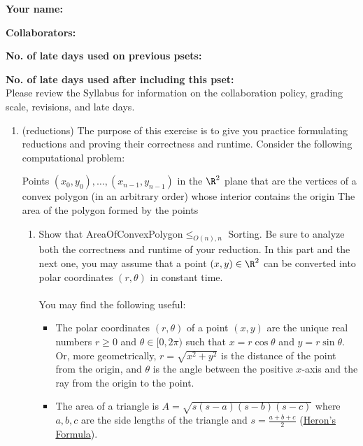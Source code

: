 \documentclass[11pt]{article}
\begin{document}

\textbf{Your name: }

\textbf{Collaborators: }

\textbf{No. of late days used on previous psets: }

\textbf{No. of late days used after including this pset: }
\\

Please review the Syllabus for information on the collaboration 
policy, grading scale, revisions, and late days.


\begin{enumerate}
     \item  (reductions) The purpose of this exercise is to give you practice formulating reductions and proving their correctness and runtime.
    Consider the following computational problem:

    {Points $(x_0,y_0),\ldots,(x_{n-1},y_{n-1})$ in the $\R^2$ plane that are the vertices of a convex polygon (in an arbitrary order) whose interior contains the origin}
    {The area of the polygon formed by the points}


    \begin{enumerate}
        \item \label{part:polar} 
        Show that AreaOfConvexPolygon$\leq_{O(n),n}$ Sorting.  Be sure to analyze both the correctness and runtime of your reduction.
        In this part and the next one, you may assume that a point $(x,y)\in \R^2$ can be converted into polar coordinates $(r,\theta)$ in constant time. 
        \\\\
        You may find the following useful:
        \begin{itemize}
            \item The polar coordinates $(r,\theta)$ of a point $(x,y)$ are the unique real numbers $r\geq 0$ and $\theta\in [0,2\pi)$ such that $x=r\cos \theta$ and $y=r\sin \theta$. Or, more geometrically, $r=\sqrt{x^2+y^2}$ is the distance of the point from the origin, and $\theta$ is the angle between the positive $x$-axis and the ray from the origin to the point.
            \item The area of a triangle is $A = \sqrt{s(s-a)(s-b)(s-c)}$ where $a, b, c$ are the side lengths of the triangle and $s = \frac{a + b + c}{2}$ (\href{https://en.wikipedia.org/wiki/Heron\%27s_formula}{Heron's Formula}).
        \end{itemize}
        

\end{enumerate}
\end{enumerate}
\end{document}
